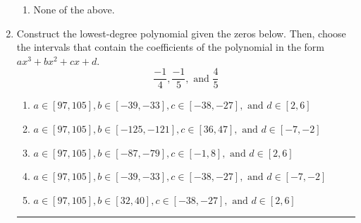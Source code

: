 \documentclass[14pt]{extbook}
\newcommand{\litem}[1]{\item#1\hspace*{-1cm}\rule{\textwidth}{0.4pt}}
\begin{document}
\begin{enumerate}
{\begin{enumerate}[label=\Alph*.]
\item None of the above.
\end{enumerate} }
\litem{
Construct the lowest-degree polynomial given the zeros below. Then, choose the intervals that contain the coefficients of the polynomial in the form $ax^3+bx^2+cx+d$.\[ \frac{-1}{4}, \frac{-1}{5}, \text{ and } \frac{4}{5} \]\begin{enumerate}[label=\Alph*.]
\item \( a \in [97, 105], b \in [-39, -33], c \in [-38, -27], \text{ and } d \in [2, 6] \)
\item \( a \in [97, 105], b \in [-125, -121], c \in [36, 47], \text{ and } d \in [-7, -2] \)
\item \( a \in [97, 105], b \in [-87, -79], c \in [-1, 8], \text{ and } d \in [2, 6] \)
\item \( a \in [97, 105], b \in [-39, -33], c \in [-38, -27], \text{ and } d \in [-7, -2] \)
\item \( a \in [97, 105], b \in [32, 40], c \in [-38, -27], \text{ and } d \in [2, 6] \)


\end{enumerate}}
\end{enumerate}
\end{document}

